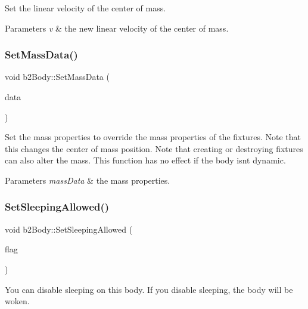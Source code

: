 Set the linear velocity of the center of mass. 
\begin{DoxyParams}{Parameters}
{\em v} & the new linear velocity of the center of mass. \\
\hline
\end{DoxyParams}
\mbox{\label{classb2_body_a58a641fedf8a81e1e26d09ec00a22fe2}} 
\subsubsection{\texorpdfstring{SetMassData()}{SetMassData()}}
{\footnotesize\ttfamily void b2\+Body\+::\+Set\+Mass\+Data (\begin{DoxyParamCaption}\item[{const \mbox{\hyperlink{structb2_mass_data}{b2\+Mass\+Data}} $\ast$}]{data }\end{DoxyParamCaption})}

Set the mass properties to override the mass properties of the fixtures. Note that this changes the center of mass position. Note that creating or destroying fixtures can also alter the mass. This function has no effect if the body isn\textquotesingle{}t dynamic. 
\begin{DoxyParams}{Parameters}
{\em mass\+Data} & the mass properties. \\
\hline
\end{DoxyParams}
\mbox{\label{classb2_body_a229a6de228416203fecbf7a7544c33bb}} 
\subsubsection{\texorpdfstring{SetSleepingAllowed()}{SetSleepingAllowed()}}
{\footnotesize\ttfamily void b2\+Body\+::\+Set\+Sleeping\+Allowed (\begin{DoxyParamCaption}\item[{bool}]{flag }\end{DoxyParamCaption})\hspace{0.3cm}{\ttfamily [inline]}}

You can disable sleeping on this body. If you disable sleeping, the body will be woken. \mbox{\label{classb2_body_a4686f32bbce5723761e9719c706eca11}} 
